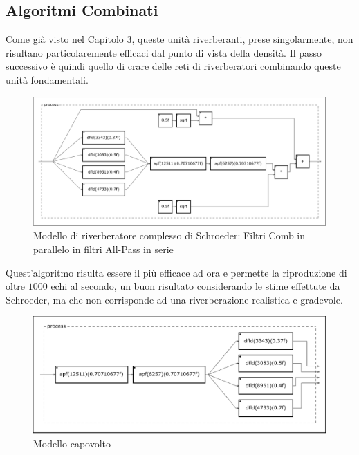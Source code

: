 \subsection{Algoritmi Combinati}

Come già visto nel Capitolo 3, 
queste unità riverberanti, prese singolarmente, non risultano particolaremente
efficaci dal punto di vista della densità. Il passo successivo è quindi quello
di crare delle reti di riverberatori combinando queste unità fondamentali.



\begin{figure}[htp]
\centering
\includegraphics[width=1\textwidth]{Code/mscombapf-svg/process.pdf}
\caption{Modello di riverberatore complesso di Schroeder: Filtri Comb in parallelo
         in filtri All-Pass in serie}
\label{fig:mscombapf}
\end{figure}

Quest'algoritmo risulta essere il più efficace ad ora e permette la
riproduzione di oltre $1000$ echi al secondo, un buon risultato considerando
le stime effettute da Schroeder, ma che non corrisponde ad una riverberazione
realistica e gradevole.




\begin{figure}[htp]
\centering
\includegraphics[width=1\textwidth]{Code/msapfcomb-svg/process.pdf}
\caption{Modello capovolto}
\label{fig:msapfcomb}
\end{figure}
